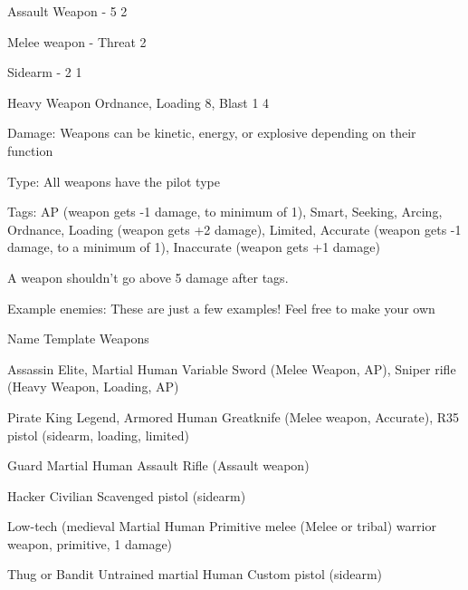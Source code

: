  Assault Weapon               -                            5                        2

 Melee weapon                 -                            Threat                   2




 Sidearm                      -                             2                       1

 Heavy Weapon                 Ordnance, Loading             8, Blast 1              4

Damage: Weapons can be kinetic, energy, or explosive depending on their function

Type: All weapons have the pilot type

Tags: AP (weapon gets -1 damage, to minimum of 1), Smart, Seeking, Arcing, Ordnance,
Loading (weapon gets +2 damage), Limited, Accurate (weapon gets -1 damage, to a minimum of
1), Inaccurate (weapon gets +1 damage)


A weapon shouldn't go above 5 damage after tags.


                                            Example enemies:
These are just a few examples! Feel free to make your own


 Name                     Template                              Weapons

 Assassin                  Elite, Martial Human                 Variable Sword (Melee
                                                                Weapon, AP), Sniper rifle
                                                                (Heavy Weapon, Loading,
                                                                AP)

 Pirate King               Legend, Armored Human                Greatknife (Melee weapon,
                                                                Accurate), R35 pistol
                                                                (sidearm, loading, limited)

 Guard                     Martial Human                        Assault Rifle (Assault
                                                                weapon)

 Hacker                    Civilian                             Scavenged pistol (sidearm)

 Low-tech (medieval        Martial Human                        Primitive melee (Melee
 or tribal) warrior                                             weapon, primitive, 1
                                                                damage)

 Thug or Bandit            Untrained martial Human              Custom pistol (sidearm)
